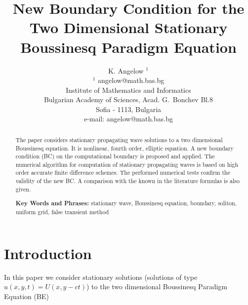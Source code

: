 \documentclass[12pt]{article}
\theoremstyle{theorem}
\theoremstyle{defi}
\begin{document}

\title{New Boundary Condition for the Two Dimensional Stationary Boussinesq Paradigm Equation}

\author{K. Angelow $^1$ \\[6pt]
$^1$ angelow@math.bas.bg\\ 
Institute of Mathematics and Informatics\\
Bulgarian Academy of Sciences, Acad. G.~Bonchev Bl.8\\
Sofia - 1113, Bulgaria\\
e-mail: angelow@math.bas.bg\\[6pt] }

\maketitle

\begin{abstract}

The paper considers stationary propagating wave solutions to a two dimensional Boussinesq equation. It is nonlinear, fourth order, elliptic equation. A new boundary condition (BC) on the computational boundary is proposed and applied. The numerical algorithm for computation of stationary propagating waves is based on high order accurate finite difference schemes. The performed numerical tests confirm the validity of the new BC. A comparison with the known in the literature formulas is also given.

\medskip


{\bf Key Words and Phrases:} stationary wave, Boussinesq equation, boundary, soliton, uniform grid, false transient method

\end{abstract}

\section{Introduction}
In this paper we consider stationary solutions (solutions of type  $u(x,y,t)=U(x,y - ct)$) to the two dimensional Boussinesq Paradigm Equation (BE) 
\end{document}
